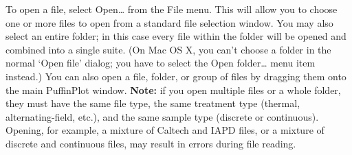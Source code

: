 \documentclass[a4paper,british]{article}
\newcommand{\caps}[1]{\MakeTextUppercase{#1}} %
\begin{document}
To open a file, select \textsf{Open\ldots} from the \textsf{File} menu.
This will allow you to choose one or more files to open from a standard
file selection window. You may also select an entire folder; in this
case every file within the folder will be opened and combined into a
single suite. (On Mac OS X, you can't choose a folder in the normal
`Open file' dialog; you have to select the \textsf{Open folder\ldots}
menu item instead.) You can also open a file, folder, or group of files
by dragging them onto the main PuffinPlot window. \textbf{Note:} if you
open multiple files or a whole folder, they must have the same file
type, the same treatment type (thermal, alternating-field, etc.), and
the same sample type (discrete or continuous). Opening, for example, a
mixture of Caltech and \caps{iapd} files, or a mixture of discrete and
continuous files, may result in errors during file reading.
\end{document}
